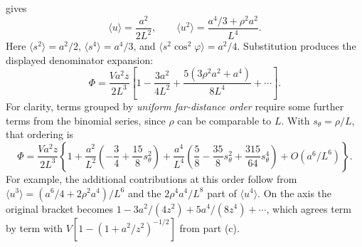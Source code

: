 gives
\[
\langle u\rangle=\frac{a^2}{2L^2},\qquad
\langle u^2\rangle=\frac{a^4/3+\rho^2a^2}{L^4}.
\]
Here $\langle s^2\rangle=a^2/2$,
$\langle s^4\rangle=a^4/3$, and
$\langle s^2\cos^2\varphi\rangle=a^2/4$.
Substitution produces the displayed denominator expansion:
\[
\Phi=\frac{Va^2z}{2L^3}
 \left[1-\frac{3a^2}{4L^2}
       +\frac{5(3\rho^2a^2+a^4)}{8L^4}+\cdots\right].
\]
For clarity, terms grouped by \emph{uniform far-distance order}
require some further terms from the binomial series, since
$\rho$ can be comparable to $L$. With $s_\theta=\rho/L$, that ordering is
\[
\Phi=\frac{Va^2z}{2L^3}\left\{
1+\frac{a^2}{L^2}\left(-\frac34+\frac{15}{8}s_\theta^2\right)
+\frac{a^4}{L^4}\left(\frac58-\frac{35}{8}s_\theta^2
                         +\frac{315}{64}s_\theta^4\right)
+O(a^6/L^6)\right\}.
\]
For example, the additional contributions at this order follow from
$\langle u^3\rangle=(a^6/4+2\rho^2a^4)/L^6$ and the
$2\rho^4a^4/L^8$ part of $\langle u^4\rangle$.
On the axis the original bracket becomes
$1-3a^2/(4z^2)+5a^4/(8z^4)+\cdots$, which agrees term by term with
$V[1-(1+a^2/z^2)^{-1/2}]$ from part (c).

